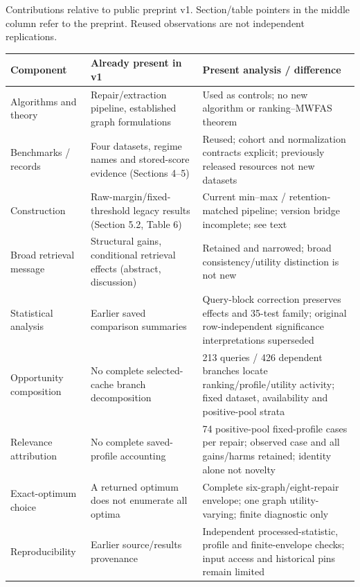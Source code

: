 \begin{supplementtable}
\caption{Contributions relative to public preprint v1. Section/table pointers in the middle column refer to the preprint. Reused observations are not independent replications.}\label{tab:preprint-delta}\papertable
\begin{tabularx}{\linewidth}{@{}L{2.4cm}L{3.5cm}Y@{}}\toprule
Component & Already present in v1 & Present analysis / difference\\\midrule
Algorithms and theory & Repair/extraction pipeline, established graph formulations & Used as controls; no new algorithm or ranking--MWFAS theorem\\\addlinespace
Benchmarks / records & Four datasets, regime names and stored-score evidence (Sections 4--5) & Reused; cohort and normalization contracts explicit; previously released resources not new datasets\\\addlinespace
Construction & Raw-margin/fixed-threshold legacy results (Section 5.2, Table 6) & Current min--max / retention-matched pipeline; version bridge incomplete; see text\\\addlinespace
Broad retrieval message & Structural gains, conditional retrieval effects (abstract, discussion) & Retained and narrowed; broad consistency/utility distinction is not new\\\addlinespace
Statistical analysis & Earlier saved comparison summaries & Query-block correction preserves effects and 35-test family; original row-independent significance interpretations superseded\\\addlinespace
Opportunity composition & No complete selected-cache branch decomposition & 213 queries / 426 dependent branches locate ranking/profile/utility activity; fixed dataset, availability and positive-pool strata\\\addlinespace
Relevance attribution & No complete saved-profile accounting & 74 positive-pool fixed-profile cases per repair; observed case and all gains/harms retained; identity alone not novelty\\\addlinespace
Exact-optimum choice & A returned optimum does not enumerate all optima & Complete six-graph/eight-repair envelope; one graph utility-varying; finite diagnostic only\\\addlinespace
Reproducibility & Earlier source/results provenance & Independent processed-statistic, profile and finite-envelope checks; input access and historical pins remain limited\\\bottomrule
\end{tabularx}
\end{supplementtable}
